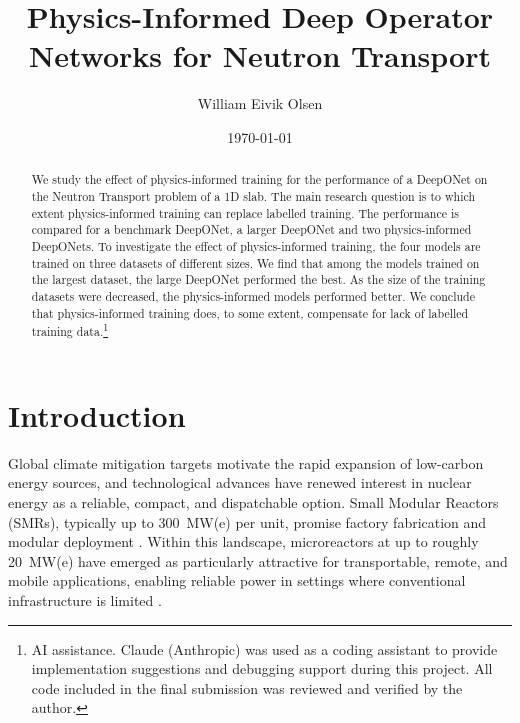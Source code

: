 \documentclass[%
 reprint,
 amsmath,amssymb,
 aps,
]{revtex4-1}
\begin{document}

\title{Physics-Informed Deep Operator Networks for Neutron Transport}

\author{William Eivik Olsen}

\date{\today}

\begin{abstract}
We study the effect of physics-informed training for the performance of a DeepONet on the Neutron Transport problem of a 1D slab. The main research question
is to which extent physics-informed training can replace labelled training. The performance is compared for a benchmark DeepONet, a larger DeepONet and two
physics-informed DeepONets. To investigate the effect of physics-informed training, the four models are trained on three datasets of different sizes. We find
that among the models trained on the largest dataset, the large DeepONet performed the best. As the size of the training datasets were decreased, the
physics-informed models performed better. We conclude that physics-informed training does, to some extent, compensate for lack of labelled training data.\footnote{AI assistance. Claude (Anthropic) was used as a coding assistant to provide implementation suggestions and debugging support during this project. All code included in the final submission was reviewed and verified by the author.}
\end{abstract}

\maketitle

\section{Introduction}

Global climate mitigation targets motivate the rapid expansion of low-carbon energy sources, and technological advances have renewed interest in
nuclear energy as a reliable, compact, and dispatchable option. Small Modular Reactors (SMRs), typically up to 300~MW(e) per unit, promise factory
fabrication and modular deployment \cite{IAEA_2024_SMR}. Within this landscape, microreactors at up to roughly 20~MW(e) have emerged as particularly
attractive for transportable, remote, and mobile applications, enabling reliable power in settings where conventional infrastructure is limited
\cite{black2023prospects}.
\end{document}
